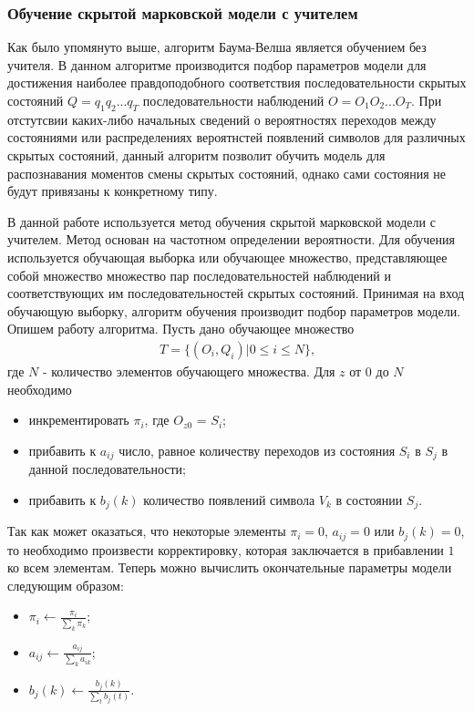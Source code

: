 \subsubsection{Обучение скрытой марковской модели с учителем}
Как было упомянуто выше, алгоритм Баума-Велша является обучением без учителя. В данном алгоритме производится подбор параметров модели для достижения наиболее правдоподобного соответствия последовательности скрытых состояний \(Q=q_1q_2...q_T\) последовательности наблюдений \(O=O_1O_2...O_T\). При отстутсвии каких-либо начальных сведений о вероятностях переходов между состояниями или распределениях вероятнстей появлений символов для различных скрытых состояний, данный алгоритм позволит обучить модель для распознавания моментов смены скрытых состояний, однако сами состояния не будут привязаны к конкретному типу.

В данной работе используется метод обучения скрытой марковской модели с учителем. Метод основан на частотном определении вероятности. Для обучения используется обучающая выборка или обучающее множество, представляющее собой множество множество пар последовательностей наблюдений и соответствующих им последовательностей скрытых состояний. Принимая на вход обучающую выборку, алгоритм обучения производит подбор параметров модели. Опишем работу алгоритма. Пусть дано обучающее множество
\begin{align*}
T = \{(O_i, Q_i) | 0 \le i \le N\} \text{,}
\end{align*}
где \(N\) - количество элементов обучающего множества. Для \(z\) от \(0\) до \(N\) необходимо
\begin{itemize}
\item
инкрементировать \(\pi_i\), где \(O_{z0}\) = \(S_i\);
\item
прибавить к \(a_{ij}\) число, равное количеству переходов из состояния \(S_i\) в \(S_j\) в данной последовательности;
\item
прибавить к \(b_j(k)\) количество появлений символа \(V_k\) в состоянии \(S_j\).
\end{itemize}
Так как может оказаться, что некоторые элементы \(\pi_i = 0\), \(a_{ij} = 0\) или \(b_j(k) = 0\), то необходимо произвести корректировку, которая заключается в прибавлении \(1\) ко всем элементам.
Теперь можно вычислить окончательные параметры модели следующим образом:
\begin{itemize}
\item
\(\pi_i \leftarrow \frac{\pi_i}{\displaystyle\sum_{k} \pi_k} \);
\item
\(a_{ij} \leftarrow \frac{a_{ij}}{\displaystyle\sum_{k} a_{ik}} \);
\item
\(b_j(k) \leftarrow \frac{b_j(k)}{\displaystyle\sum_{t} b_j(t)} \).
\end{itemize}

